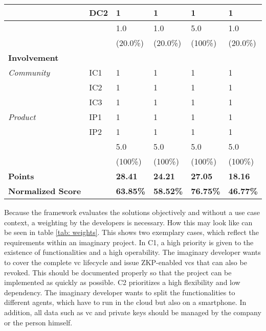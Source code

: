 \begin{longtable}{@{\extracolsep{\fill}}llllll@{}}
                               & DC2 & 1 & 1 & 1 & 1 \\     
                               \hline
                               && 1.0 & 1.0 & 5.0 & 1.0 \\
                               && (20.0\%) & (20.0\%) & (100\%) & (20.0\%) \\
                               \midrule
        \textbf{Involvement} &&&&&\\
        \textit{Community}     & IC1 & 1 & 1 & 1 & 1 \\
                               & IC2 & 1 & 1 & 1 & 1 \\                       
                               & IC3 & 1 & 1 & 1 & 1 \\                       
        \textit{Product}       & IP1 & 1 & 1 & 1 & 1 \\
                               & IP2 & 1 & 1 & 1 & 1 \\    
                               \hline
                               && 5.0 & 5.0 & 5.0 & 5.0 \\                        
                               && (100\%) & (100\%) & (100\%) & (100\%) \\
                              \hline
        
        \textbf{Points} & & \textbf{28.41} & \textbf{24.21} & \textbf{27.05} & \textbf{18.16} \\
        \textbf{Normalized Score} & & \textbf{63.85\%} & \textbf{58.52\%} & \textbf{76.75\%} & \textbf{46.77\%} \\
        \bottomrule
    \end{longtable}
    
    Because the framework evaluates the solutions objectively and without a use case context, a weighting by the developers is necessary. How this may look like can be seen in table \ref{tab: weights}. This shows two exemplary cases, which reflect the requirements within an imaginary project. In C1, a high priority is given to the existence of functionalities and a high operability. The imaginary developer wants to cover the complete \ac{vc} lifecycle and issue \ac{ZKP}-enabled \acp{vc} that can also be revoked. This should be documented properly so that the project can be implemented as quickly as possible. C2 prioritizes a high flexibility and low dependency. The imaginary developer wants to split the functionalities to different agents, which have to run in the cloud but also on a smartphone. In addition, all data such as \ac{vc} and private keys should be managed by the company or the person himself.
    
